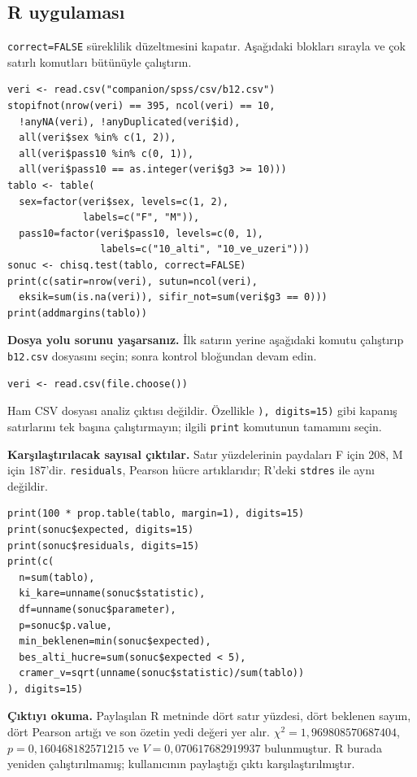 \par\noindent\begin{minipage}{\linewidth}
\subsection{R uygulaması}
\label{sec:r-gercek-b12}

\texttt{correct=FALSE} süreklilik düzeltmesini kapatır. Aşağıdaki
blokları sırayla ve çok satırlı komutları bütünüyle çalıştırın.

\begin{lstlisting}[style=prismR]
veri <- read.csv("companion/spss/csv/b12.csv")
stopifnot(nrow(veri) == 395, ncol(veri) == 10,
  !anyNA(veri), !anyDuplicated(veri$id),
  all(veri$sex %in% c(1, 2)),
  all(veri$pass10 %in% c(0, 1)),
  all(veri$pass10 == as.integer(veri$g3 >= 10)))
tablo <- table(
  sex=factor(veri$sex, levels=c(1, 2),
             labels=c("F", "M")),
  pass10=factor(veri$pass10, levels=c(0, 1),
                labels=c("10_alti", "10_ve_uzeri")))
sonuc <- chisq.test(tablo, correct=FALSE)
print(c(satir=nrow(veri), sutun=ncol(veri),
  eksik=sum(is.na(veri)), sifir_not=sum(veri$g3 == 0)))
print(addmargins(tablo))
\end{lstlisting}
\end{minipage}\par

\textbf{Dosya yolu sorunu yaşarsanız.} İlk satırın yerine aşağıdaki
komutu çalıştırıp \texttt{b12.csv} dosyasını seçin; sonra kontrol
bloğundan devam edin.
\begin{lstlisting}[style=prismR]
veri <- read.csv(file.choose())
\end{lstlisting}
Ham CSV dosyası analiz çıktısı değildir. Özellikle
\texttt{), digits=15)} gibi kapanış satırlarını tek başına çalıştırmayın;
ilgili \texttt{print} komutunun tamamını seçin.

\par\noindent\begin{minipage}{\linewidth}
\textbf{Karşılaştırılacak sayısal çıktılar.} Satır yüzdelerinin
paydaları F için 208, M için 187'dir. \texttt{residuals}, Pearson
hücre artıklarıdır; R'deki \texttt{stdres} ile aynı değildir.

\begin{lstlisting}[style=prismR]
print(100 * prop.table(tablo, margin=1), digits=15)
print(sonuc$expected, digits=15)
print(sonuc$residuals, digits=15)
print(c(
  n=sum(tablo),
  ki_kare=unname(sonuc$statistic),
  df=unname(sonuc$parameter),
  p=sonuc$p.value,
  min_beklenen=min(sonuc$expected),
  bes_alti_hucre=sum(sonuc$expected < 5),
  cramer_v=sqrt(unname(sonuc$statistic)/sum(tablo))
), digits=15)
\end{lstlisting}

\textbf{Çıktıyı okuma.} Paylaşılan R metninde dört satır yüzdesi,
dört beklenen sayım, dört Pearson artığı ve son özetin yedi değeri
yer alır. $\chi^2=1{,}969808570687404$, $p=0{,}160468182571215$
ve $V=0{,}070617682919937$ bulunmuştur. R burada yeniden
çalıştırılmamış; kullanıcının paylaştığı çıktı karşılaştırılmıştır.
\end{minipage}\par

